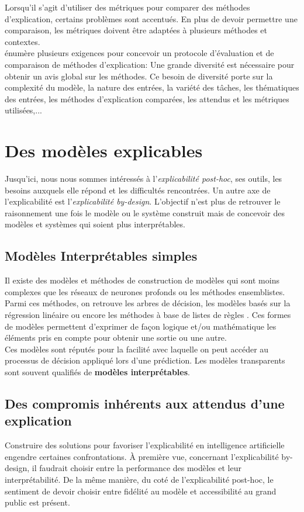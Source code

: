 \documentclass{report}
\newcommand{\alh}[1]{\textcolor{teal}{#1}}
\begin{document}
    Lorsqu'il s'agit d'utiliser des métriques pour comparer des méthodes d'explication, certains problèmes sont accentués. En plus de devoir permettre une comparaison, les métriques doivent être adaptées à plusieurs méthodes et contextes. \\
    \cite{mersha_evaluating_2025} énumère plusieurs exigences pour concevoir un protocole d'évaluation et de comparaison de méthodes d'explication: Une grande diversité est nécessaire pour obtenir un avis global sur les méthodes. Ce besoin de diversité porte sur la complexité du modèle, la nature des entrées, la variété des tâches, les thématiques des entrées, les méthodes d'explication comparées, les attendus et les métriques utilisées,...
    

\chapter{Des modèles explicables}
Jusqu'ici, nous nous sommes intéressés à l'\emph{explicabilité post-hoc}, ses outils, les besoins auxquels elle répond et les difficultés rencontrées. Un autre axe de l'explicabilité est l'\emph{explicabilité by-design}. L'objectif n'est plus de retrouver le raisonnement une fois le modèle ou le système construit mais de concevoir des modèles et systèmes qui soient plus interprétables.

\section{Modèles Interprétables simples}
    \label{mod_interpretables}
    
    Il existe des modèles et méthodes de construction de modèles qui sont moins complexes que les réseaux de neurones profonds ou les méthodes ensemblistes. Parmi ces méthodes, on retrouve les arbres de décision, les modèles basés sur la régression linéaire ou encore les méthodes à base de listes de règles \cite[Chapitres~6 à 11]{molnar_interpretable_2025}. Ces formes de modèles permettent d'exprimer de façon logique et/ou mathématique les éléments pris en compte pour obtenir une sortie ou une autre.\\
    Ces modèles sont réputés pour la facilité avec laquelle on peut accéder au processus de décision appliqué lors d'une prédiction. Les modèles transparents sont souvent qualifiés de \textbf{modèles interprétables}. 
    
    
\section{Des compromis inhérents aux attendus d'une explication}
    \label{sec:tradesoff}
    Construire des solutions pour favoriser l'explicabilité en intelligence artificielle engendre certaines confrontations. À première vue, concernant l'explicabilité by-design, il faudrait choisir entre la performance des modèles et leur interprétabilité. De la même manière, du coté de l'explicabilité post-hoc, le sentiment de devoir choisir entre fidélité au modèle et accessibilité au grand public est présent.
    
\end{document}
